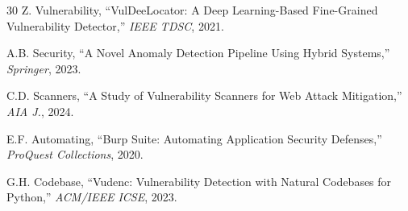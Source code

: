 \documentclass[journal,onecolumn]{IEEEtran}
\begin{document}
\begin{thebibliography}{30}
Z. Vulnerability, ``VulDeeLocator: A Deep Learning-Based Fine-Grained Vulnerability Detector,'' \textit{IEEE TDSC}, 2021.

A.B. Security, ``A Novel Anomaly Detection Pipeline Using Hybrid Systems,'' \textit{Springer}, 2023.

C.D. Scanners, ``A Study of Vulnerability Scanners for Web Attack Mitigation,'' \textit{AIA J.}, 2024.

E.F. Automating, ``Burp Suite: Automating Application Security Defenses,'' \textit{ProQuest Collections}, 2020.

G.H. Codebase, ``Vudenc: Vulnerability Detection with Natural Codebases for Python,'' \textit{ACM/IEEE ICSE}, 2023.

\end{thebibliography}
\end{document}
